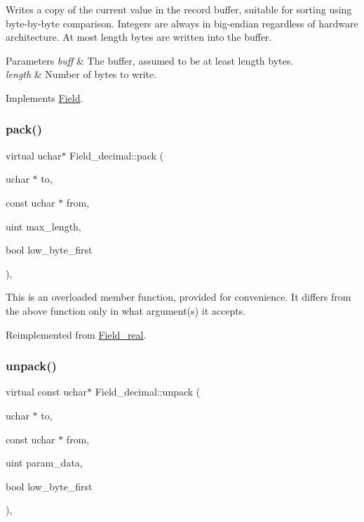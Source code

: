 Writes a copy of the current value in the record buffer, suitable for sorting using byte-\/by-\/byte comparison. Integers are always in big-\/endian regardless of hardware architecture. At most length bytes are written into the buffer.


\begin{DoxyParams}{Parameters}
{\em buff} & The buffer, assumed to be at least length bytes.\\
\hline
{\em length} & Number of bytes to write. \\
\hline
\end{DoxyParams}


Implements \mbox{\hyperlink{classField_af3bc27d237b6ae6ef3dc7a2aec3d79ac}{Field}}.

\mbox{\label{classField__decimal_a85c1f4498b4f8f773056efcf6c3a901a}} 
\subsubsection{\texorpdfstring{pack()}{pack()}}
{\footnotesize\ttfamily virtual uchar$\ast$ Field\+\_\+decimal\+::pack (\begin{DoxyParamCaption}\item[{uchar $\ast$}]{to,  }\item[{const uchar $\ast$}]{from,  }\item[{uint}]{max\+\_\+length,  }\item[{bool}]{low\+\_\+byte\+\_\+first }\end{DoxyParamCaption})\hspace{0.3cm}{\ttfamily [inline]}, {\ttfamily [virtual]}}

This is an overloaded member function, provided for convenience. It differs from the above function only in what argument(s) it accepts.

Reimplemented from \mbox{\hyperlink{classField__real_a350715a27630782dd1247287d2446480}{Field\+\_\+real}}.

\mbox{\label{classField__decimal_a175db70d41ae30df50a1ec04d8680363}} 
\subsubsection{\texorpdfstring{unpack()}{unpack()}}
{\footnotesize\ttfamily virtual const uchar$\ast$ Field\+\_\+decimal\+::unpack (\begin{DoxyParamCaption}\item[{uchar $\ast$}]{to,  }\item[{const uchar $\ast$}]{from,  }\item[{uint}]{param\+\_\+data,  }\item[{bool}]{low\+\_\+byte\+\_\+first }\end{DoxyParamCaption})\hspace{0.3cm}{\ttfamily [inline]}, {\ttfamily [virtual]}}

